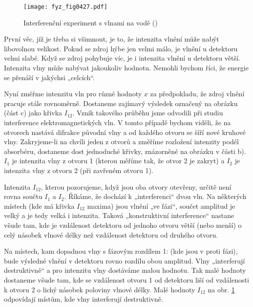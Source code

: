     \begin{figure}[hb!] %
      \centering
      \texttt{[image: fyz\_fig0427.pdf]}
      \caption{Interferenční experiment s vlnami na vodě (\cite[s.~697]{Feynman01})}
      \label{fyz:fig0427}
    \end{figure}

    První věc, jíž je třeba si všimnout, je to, že intenzita vlnění může nabýt libovolnou velikost.
    Pokud se zdroj hýbe jen velmi málo, je vlnění u detektoru velmi slabé. Když se zdroj pohybuje
    víc, je i intenzita vlnění u detektoru větší. Intenzita vlny může nabývat jakoukoliv hodnotu.
    Nemohli bychom říci, že energie se přenáší v jakýchsi „celcích“.
    
    Nyní změřme intenzitu vln pro různé hodnoty \(x\) za předpokladu, že zdroj vlnění pracuje stále
    rovnoměrně. Dostaneme zajímavý výsledek označený na obrázku (část c) jako křivka \(I_{12}\).
    Vznik takového průběhu jsme odvodili při studiu interference elektromagnetických vln. V tomto
    případě bychom viděli, že na otvorech nastává difrakce původní vlny a od každého otvoru se šíří
    nové kruhové vlny. Zakryjeme-li na chvíli jeden z otvorů a změříme rozložení intenzity podél
    absorbéru, dostaneme dost jednoduché křivky, znázorněné na obrázku v části b). \(I_1\) je
    intenzita vlny z otvoru 1 (kterou měříme tak, že otvor 2 je zakryt) a \(I_2\) je intenzita vlny
    z otvoru 2 (při zavřeném otvoru 1).

    Intenzita \(I_{12}\), kterou pozorujeme, když jsou oba otvory otevřeny, určitě není rovna součtu
    \(I_1\) a \(I_2\). Říkáme, že dochází k „interferenci“ dvou vln. Na některých místech (kde má
    křivka \(I_{12}\) maxima) jsou vlnění „ve fázi“, součet amplitud je velký a je tedy velká i
    intenzita. Taková „konstruktivní interference“ nastane všude tam, kde je vzdálenost detektoru od
    jednoho otvoru větší (nebo menší) o celý násobek vlnové délky než vzdálenost detektoru od
    druhého otvoru.

    Na místech, kam dopadnou vlny s fázovým rozdílem 1: (kde jsou v proti fázi), bude výsledné
    vlnění v detektoru rovno rozdílu obou amplitud. Vlny „interferují destruktivně“ a pro intenzitu
    vlny dostáváme malou hodnotu. Tak malé hodnoty dostaneme všude tam, kde se vzdálenost otvoru 1
    od detektoru liší od vzdálenosti k otvoru 2 o lichý násobek poloviny vlnové délky. Malé hodnoty
    \(I_{12}\) na obr. \ref{fyz:fig0427} odpovídají místům, kde vlny interferují destruktivně. 

